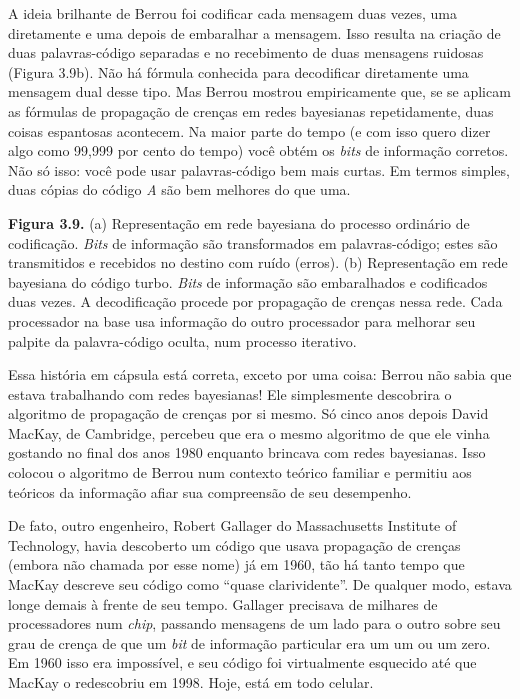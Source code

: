 \documentclass[11pt,a5paper,twoside]{book}
\begin{document}
A ideia brilhante de Berrou foi codificar cada mensagem duas vezes, uma diretamente e uma depois de embaralhar a mensagem. Isso resulta na criação de duas palavras-código separadas e no recebimento de duas mensagens ruidosas (Figura 3.9b). Não há fórmula conhecida para decodificar diretamente uma mensagem dual desse tipo. Mas Berrou mostrou empiricamente que, se se aplicam as fórmulas de propagação de crenças em redes bayesianas repetidamente, duas coisas espantosas acontecem. Na maior parte do tempo (e com isso quero dizer algo como 99,999 por cento do tempo) você obtém os \textit{bits} de informação corretos. Não só isso: você pode usar palavras-código bem mais curtas. Em termos simples, duas cópias do código \textit{A} são bem melhores do que uma.

\textbf{Figura 3.9.} (a) Representação em rede bayesiana do processo ordinário de codificação. \textit{Bits} de informação são transformados em palavras-código; estes são transmitidos e recebidos no destino com ruído (erros). (b) Representação em rede bayesiana do código turbo. \textit{Bits} de informação são embaralhados e codificados duas vezes. A decodificação procede por propagação de crenças nessa rede. Cada processador na base usa informação do outro processador para melhorar seu palpite da palavra-código oculta, num processo iterativo.

Essa história em cápsula está correta, exceto por uma coisa: Berrou não sabia que estava trabalhando com redes bayesianas! Ele simplesmente descobrira o algoritmo de propagação de crenças por si mesmo. Só cinco anos depois David MacKay, de Cambridge, percebeu que era o mesmo algoritmo de que ele vinha gostando no final dos anos 1980 enquanto brincava com redes bayesianas. Isso colocou o algoritmo de Berrou num contexto teórico familiar e permitiu aos teóricos da informação afiar sua compreensão de seu desempenho.

De fato, outro engenheiro, Robert Gallager do Massachusetts Institute of Technology, havia descoberto um código que usava propagação de crenças (embora não chamada por esse nome) já em 1960, tão há tanto tempo que MacKay descreve seu código como “quase clarividente”. De qualquer modo, estava longe demais à frente de seu tempo. Gallager precisava de milhares de processadores num \textit{chip}, passando mensagens de um lado para o outro sobre seu grau de crença de que um \textit{bit} de informação particular era um um ou um zero. Em 1960 isso era impossível, e seu código foi virtualmente esquecido até que MacKay o redescobriu em 1998. Hoje, está em todo celular.
\end{document}
